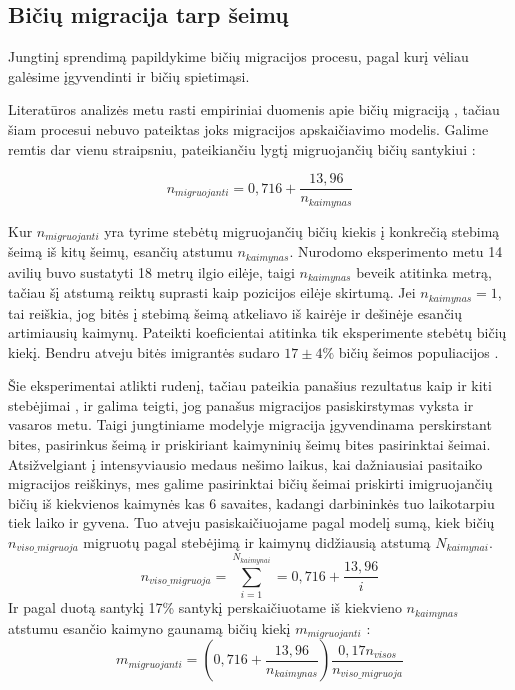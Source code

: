 \documentclass{VUMIFKompMagistrinis}
\begin{document}
\subsection{Bičių migracija tarp šeimų}
Jungtinį sprendimą papildykime bičių migracijos procesu, pagal kurį vėliau galėsime įgyvendinti ir bičių spietimąsi.

Literatūros analizės metu rasti empiriniai duomenis apie bičių migraciją \cite{PfC98, BPC16}, tačiau šiam procesui nebuvo pateiktas joks migracijos apskaičiavimo modelis. Galime remtis dar vienu straipsniu, pateikiančiu lygtį migruojančių bičių santykiui \cite{FNF15}:

\begin{equation}
    n_{migruojanti} = 0,716 + \frac{13,96}{n_{kaimynas}}
\end{equation}



Kur $n_{migruojanti}$ yra tyrime stebėtų migruojančių bičių kiekis į konkrečią stebimą šeimą iš kitų šeimų, esančių atstumu $n_{kaimynas}$. Nurodomo eksperimento metu 14 avilių buvo sustatyti 18 metrų ilgio eilėje, taigi $n_{kaimynas}$ beveik atitinka metrą, tačiau šį atstumą reiktų suprasti kaip pozicijos eilėje skirtumą. Jei $n_{kaimynas}=1$, tai reiškia, jog bitės į stebimą šeimą atkeliavo iš kairėje ir dešinėje esančių artimiausių kaimynų. Pateikti koeficientai atitinka tik eksperimente stebėtų bičių kiekį. Bendru atveju bitės imigrantės sudaro $17 ± 4\%$ bičių šeimos populiacijos \cite{BPC16}. 

Šie eksperimentai atlikti rudenį, tačiau pateikia panašius rezultatus kaip ir kiti stebėjimai \cite{PfC98, BPC16}, ir galima teigti, jog panašus migracijos pasiskirstymas vyksta ir vasaros metu. Taigi jungtiniame modelyje migracija įgyvendinama perskirstant bites, pasirinkus šeimą ir priskiriant kaimyninių šeimų bites pasirinktai šeimai. Atsižvelgiant į intensyviausio medaus nešimo laikus, kai dažniausiai pasitaiko migracijos reiškinys, mes galime pasirinktai bičių šeimai priskirti  imigruojančių bičių iš kiekvienos kaimynės kas 6 savaites, kadangi darbininkės tuo laikotarpiu tiek laiko ir gyvena. Tuo atveju pasiskaičiuojame pagal modelį sumą, kiek bičių $n_{viso\_migruoja}$ migruotų pagal stebėjimą ir kaimynų didžiausią atstumą ${N_{kaimynai}}$.
\begin{equation}
    n_{viso\_migruoja} = \sum_{i=1}^{N_{kaimynai}} = 0,716 + \frac{13,96}{i}
\end{equation}
    Ir pagal duotą santykį 17\% santykį perskaičiuotame iš kiekvieno  $n_{kaimynas}$ atstumu esančio kaimyno gaunamą bičių kiekį $m_{migruojanti}$ :
\begin{equation}   
    m_{migruojanti} = (0,716 + \frac{13,96}{n_{kaimynas}}) \frac {0,17n_{visos}}{n_{viso\_migruoja}}
\end{equation}
\end{document}
